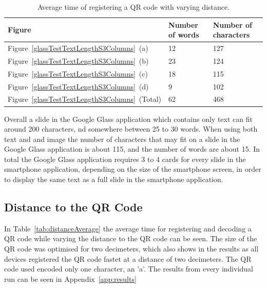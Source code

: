 	\begin{table}[ht!]
    		\caption{Average time of registering a QR code with varying distance.} \label{tab:glassTestTextLengthS3ColumnsTable}
		\centering \begin{tabularx}{\textwidth}{l|X|X} \hline
		\textbf{Figure} & \textbf{Number of words} & \textbf{Number of characters} \\ \hline \hline
       
		Figure~\ref{glassTestTextLengthS3Columns}~(a)	&12	&127	\\ \hline
		Figure~\ref{glassTestTextLengthS3Columns}~(b)	&23	&124	\\ \hline
		Figure~\ref{glassTestTextLengthS3Columns}~(c)	&18	&115	\\ \hline
		Figure~\ref{glassTestTextLengthS3Columns}~(d)	&9	&102	\\ \hline
		Figure~\ref{glassTestTextLengthS3Columns}~(Total)	&62	&468	\\ \hline
		
		\end{tabularx}
	\end{table}

Overall a slide in the Google Glass application which contains only text can fit around 200 characters, nd somewhere between 25 to 30 words. When using both text and and image the number of characters that may fit on a slide in the Google Glass application is about 115, and the number of words are about 15. In total the Google Glass application requires 3 to 4 cards for every slide in the smartphone application, depending on the size of the smartphone screen, in order to display the same text as a full slide in the smartphone application.

\subsection{Distance to the QR Code}

In Table~\ref{tab:distanceAverage} the average time for registering and decoding a QR code while varying the distance to the QR code can be seen. The size of the QR code was optimised for two decimeters, which also shows in the results as all devices registered the QR code fastet at a distance of two decimeters. The QR code used encoded only one character, an 'a'. The results from every individual run can be seen in Appendix~\ref{app:results}

